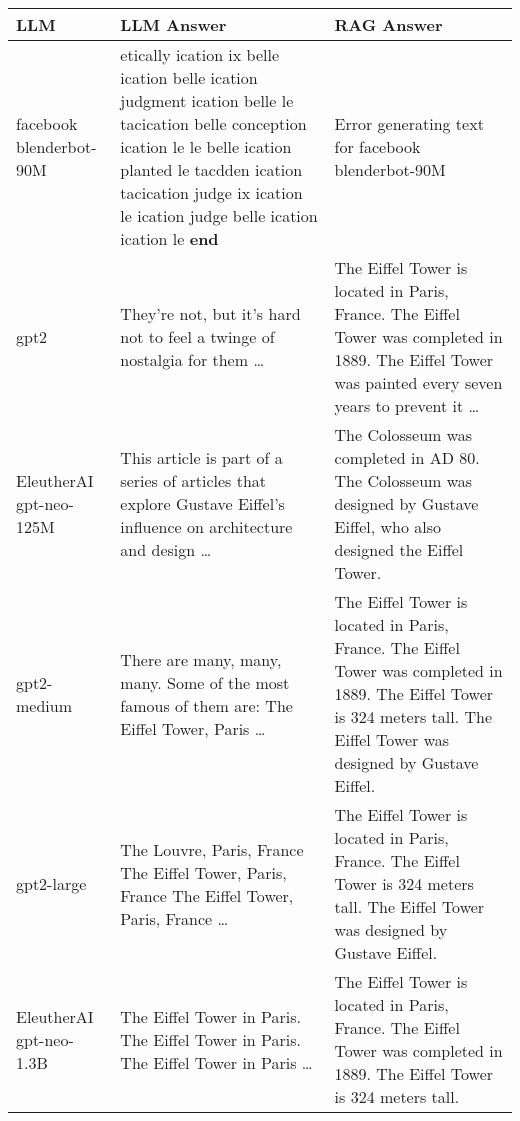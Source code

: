 \documentclass[11pt]{wseas}
\begin{document}
\begin{longtable}[]{@{}
  >{\raggedright\arraybackslash}p{}
  >{\raggedright\arraybackslash}p{}
  >{\raggedright\arraybackslash}p{}@{}}
\toprule\noalign{}
\begin{minipage}[b]{\linewidth}\raggedright
LLM
\end{minipage} & \begin{minipage}[b]{\linewidth}\raggedright
LLM Answer
\end{minipage} & \begin{minipage}[b]{\linewidth}\raggedright
RAG Answer
\end{minipage} \\
\midrule\noalign{}
\endhead
\bottomrule\noalign{}
\endlastfoot
facebook blenderbot-90M & etically ication ix belle ication belle
ication judgment ication belle le tacication belle conception ication le
le belle ication planted le tacdden ication tacication judge ix ication
le ication judge belle ication ication le \textbf{end} & Error
generating text for facebook blenderbot-90M \\
gpt2 & They're not, but it's hard not to feel a twinge of nostalgia for
them \ldots{} & The Eiffel Tower is located in Paris, France. The Eiffel
Tower was completed in 1889. The Eiffel Tower was painted every seven
years to prevent it \ldots{} \\
EleutherAI gpt-neo-125M & This article is part of a series of articles
that explore Gustave Eiffel's influence on architecture and design
\ldots{} & The Colosseum was completed in AD 80. The Colosseum was
designed by Gustave Eiffel, who also designed the Eiffel Tower. \\
gpt2-medium & There are many, many, many. Some of the most famous of
them are: The Eiffel Tower, Paris \ldots{} & The Eiffel Tower is located
in Paris, France. The Eiffel Tower was completed in 1889. The Eiffel
Tower is 324 meters tall. The Eiffel Tower was designed by Gustave
Eiffel. \\
gpt2-large & The Louvre, Paris, France The Eiffel Tower, Paris, France
The Eiffel Tower, Paris, France \ldots{} & The Eiffel Tower is located
in Paris, France. The Eiffel Tower is 324 meters tall. The Eiffel Tower
was designed by Gustave Eiffel. \\
EleutherAI gpt-neo-1.3B & The Eiffel Tower in Paris. The Eiffel Tower in
Paris. The Eiffel Tower in Paris \ldots{} & The Eiffel Tower is located
in Paris, France. The Eiffel Tower was completed in 1889. The Eiffel
Tower is 324 meters tall. \\
\end{longtable}
\end{document}
